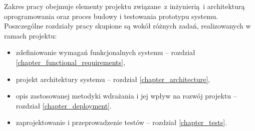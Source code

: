 Zakres pracy obejmuje elementy projektu związane~z inżynierią~i architekturą
oprogramowania oraz proces budowy i testowania prototypu systemu. Poszczególne
rozdziały pracy skupione są wokół różnych zadań, realizowanych w ramach projektu: 

\begin{itemize}
    \item zdefiniowanie wymagań funkcjonalnych systemu -- rozdział \ref{chapter_functional_requirements},
    \item projekt architektury systemu -- rozdział \ref{chapter_architecture},
    \item opis zastosowanej metodyki wdrażania i jej wpływ na rozwój projektu -- rozdział \ref{chapter_deployment}. 
    \item zaprojektowanie i przeprowadzenie testów -- rozdział \ref{chapter_tests}.
\end{itemize}
